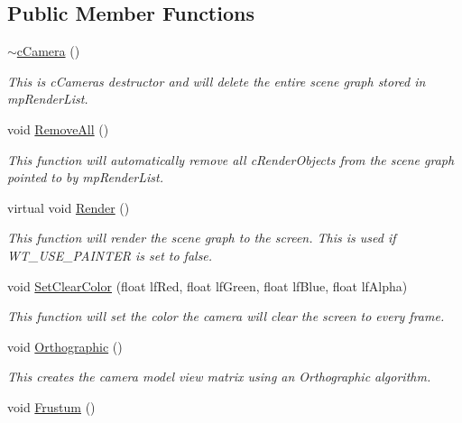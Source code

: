 \subsection*{Public Member Functions}
\begin{DoxyCompactItemize}
\item 
\hyperlink{classc_camera_a5987ab7a715b252ffb9ce534a1776f7f}{$\sim$cCamera} ()
\begin{DoxyCompactList}\small\item\em This is cCameras destructor and will delete the entire scene graph stored in mpRenderList. \item\end{DoxyCompactList}\item 
void \hyperlink{classc_camera_acf7ca694f914e1a5d1e37e7ad68fd9e1}{RemoveAll} ()
\begin{DoxyCompactList}\small\item\em This function will automatically remove all cRenderObjects from the scene graph pointed to by mpRenderList. \item\end{DoxyCompactList}\item 
virtual void \hyperlink{classc_camera_acfe96d0953540fa3938e4d415d7cb791}{Render} ()
\begin{DoxyCompactList}\small\item\em This function will render the scene graph to the screen. This is used if WT\_\-USE\_\-PAINTER is set to false. \item\end{DoxyCompactList}\item 
void \hyperlink{classc_camera_a565ec57dfb4d9fa02917a876542f2fc2}{SetClearColor} (float lfRed, float lfGreen, float lfBlue, float lfAlpha)
\begin{DoxyCompactList}\small\item\em This function will set the color the camera will clear the screen to every frame. \item\end{DoxyCompactList}\item 
void \hyperlink{classc_camera_a5723de4d866013f9d7f3ba737bac2937}{Orthographic} ()
\begin{DoxyCompactList}\small\item\em This creates the camera model view matrix using an Orthographic algorithm. \item\end{DoxyCompactList}\item 
void \hyperlink{classc_camera_abad68d50133b1153bbab0431caa8e7f5}{Frustum} ()

\end{DoxyCompactItemize}
